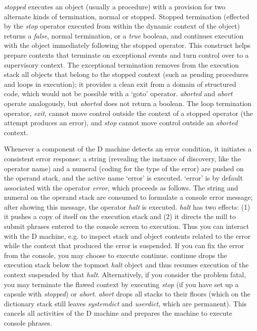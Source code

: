 \emph{stopped} executes an object (usually a procedure) with a provision for two alternate kinds of termination, normal or stopped. Stopped termination  (effected  by  the \emph{stop} operator  executed from  within  the dynamic context of the object) returns a \emph{false}, normal termination, or a \emph{true} boolean, and continues execution with the object immediately following the stopped operator. This construct helps  prepare  contexts that terminate on  exceptional events and turn control over to a supervisory context. The exceptional termination removes from the execution stack all objects that belong to the stopped context (such as pending procedures and loops in execution); it provides a clean exit from a domain of structured code, which would not be possible with a `goto' operator. \emph{aborted} and \emph{abort} operate analogously, but \emph{aborted} does not return a boolean. The loop termination operator, \emph{exit}, cannot move control outside the context of a stopped operator (the attempt produces an error), and \emph{stop} cannot move control outside an \emph{aborted} context.

Whenever a component of the D machine detects an error condition, it initiates a consistent error response: a string (revealing the instance of discovery, like the operator name) and a numeral (coding for the type of the error) are pushed on the operand stack, and the active name `error' is executed. `error' is by default associated with the operator \emph{error}, which proceeds as follows. The string and numeral on the operand stack are consumed to formulate a console error message; after showing this message, the operator \emph{halt} is executed. \emph{halt} has two effects: (1) it pushes a copy of itself on the execution stack and (2) it directs the mill to submit phrases entered to the console screen to execution. Thus you can interact with the D machine, e.g. to inspect stack and object contents related to the error while the context that produced the error is suspended. If you can fix the error from the console, you may choose to execute continue. continue drops the execution stack below the topmost \emph{halt} object and thus resumes execution of the context suspended by that \emph{halt}. Alternatively, if you consider the problem fatal, you may terminate the flawed context by executing \emph{stop} (if you have set up a capsule with \emph{stopped}) or \emph{abort}. \emph{abort} drops all stacks to their floors (which on the dictionary stack still leaves \emph{systemdict} and \emph{userdict}, which are permanent). This cancels all activities of the D machine and prepares the machine to execute console phrases.


